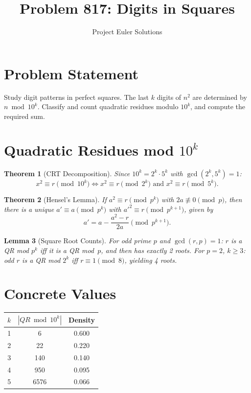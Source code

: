 \documentclass[11pt]{article}
\title{Problem 817: Digits in Squares}
\author{Project Euler Solutions}
\date{}
\newtheorem{theorem}{Theorem}
\newtheorem{lemma}[theorem]{Lemma}
\begin{document}
\maketitle

\section{Problem Statement}

Study digit patterns in perfect squares. The last $k$ digits of $n^2$ are determined by $n \bmod 10^k$. Classify and count quadratic residues modulo $10^k$, and compute the required sum.

\section{Quadratic Residues mod $10^k$}

\begin{theorem}[CRT Decomposition]
Since $10^k = 2^k \cdot 5^k$ with $\gcd(2^k, 5^k) = 1$:
\[
x^2 \equiv r \pmod{10^k} \iff x^2 \equiv r \pmod{2^k} \text{ and } x^2 \equiv r \pmod{5^k}.
\]
\end{theorem}

\begin{theorem}[Hensel's Lemma]
If $a^2 \equiv r \pmod{p^k}$ with $2a \not\equiv 0 \pmod{p}$, then there is a unique $a' \equiv a \pmod{p^k}$ with ${a'}^2 \equiv r \pmod{p^{k+1}}$, given by
\[
a' = a - \frac{a^2 - r}{2a} \pmod{p^{k+1}}.
\]
\end{theorem}

\begin{lemma}[Square Root Counts]
For odd prime $p$ and $\gcd(r, p) = 1$: $r$ is a QR mod $p^k$ iff it is a QR mod~$p$, and then has exactly 2 roots. For $p = 2$, $k \ge 3$: odd $r$ is a QR mod $2^k$ iff $r \equiv 1 \pmod{8}$, yielding 4 roots.
\end{lemma}

\section{Concrete Values}

\begin{center}
\begin{tabular}{ccc}
\toprule
$k$ & $|QR \bmod 10^k|$ & Density \\
\midrule
1 & 6 & 0.600 \\
2 & 22 & 0.220 \\
3 & 140 & 0.140 \\
4 & 950 & 0.095 \\
5 & 6576 & 0.066 \\
\bottomrule
\end{tabular}
\end{center}
\end{document}
